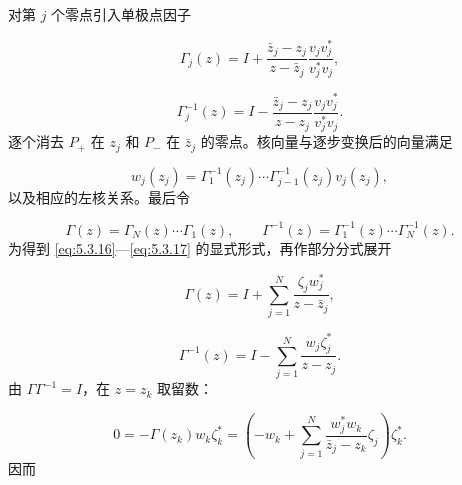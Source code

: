 \documentclass[
    lang=cn,
    scheme=chinese,
    mode=simple,
    device=normal,
    color=blue,
    math=cm,
    thmcnt=section,
    12pt
]{elegantbook}
\begin{document}
\begin{callout}
    对第 $j$ 个零点引入单极点因子

    \[
        \Gamma_j(z)
        =
        I+
        \dfrac{\bar z_j-z_j}{z-\bar z_j}
        \dfrac{v_jv_j^*}{v_j^*v_j},
    \]

    \begin{equation}
        \Gamma_j^{-1}(z)
        =
        I-
        \dfrac{\bar z_j-z_j}{z-z_j}
        \dfrac{v_jv_j^*}{v_j^*v_j}.
        \tag{5.3.19}
        \label{eq:5.3.19}
    \end{equation}
    逐个消去 $P_+$ 在 $z_j$ 和 $P_-$ 在 $\bar z_j$ 的零点。核向量与逐步变换后的向量满足

    \begin{equation}
        w_j(z_j)
        =
        \Gamma_1^{-1}(z_j)\cdots
        \Gamma_{j-1}^{-1}(z_j)v_j(z_j),
        \tag{5.3.18}
        \label{eq:5.3.18}
    \end{equation}
    以及相应的左核关系。最后令

    \begin{equation}
        \Gamma(z)
        =
        \Gamma_N(z)\cdots\Gamma_1(z),
        \qquad
        \Gamma^{-1}(z)
        =
        \Gamma_1^{-1}(z)\cdots\Gamma_N^{-1}(z).
        \tag{5.3.20}
        \label{eq:5.3.20}
    \end{equation}
    为得到 \eqref{eq:5.3.16}---\eqref{eq:5.3.17} 的显式形式，再作部分分式展开

    \begin{equation}
        \Gamma(z)
        =
        I+
        \sum\limits_{j=1}^{N}
        \dfrac{\zeta_jw_j^*}{z-\bar z_j},
        \tag{5.3.21}
        \label{eq:5.3.21}
    \end{equation}

    \begin{equation}
        \Gamma^{-1}(z)
        =
        I-
        \sum\limits_{j=1}^{N}
        \dfrac{w_j\zeta_j^*}{z-z_j}.
        \tag{5.3.22}
        \label{eq:5.3.22}
    \end{equation}
    由 $\Gamma\Gamma^{-1}=I$，在 $z=z_k$ 取留数：

    \begin{equation}
        0
        =
        -\Gamma(z_k)w_k\zeta_k^*
        =
        \left(
        -w_k+
        \sum\limits_{j=1}^{N}
        \dfrac{w_j^*w_k}{\bar z_j-z_k}\zeta_j
        \right)\zeta_k^*.
        \tag{5.3.23}
        \label{eq:5.3.23}
    \end{equation}
    因而


\end{callout}
\end{document}

